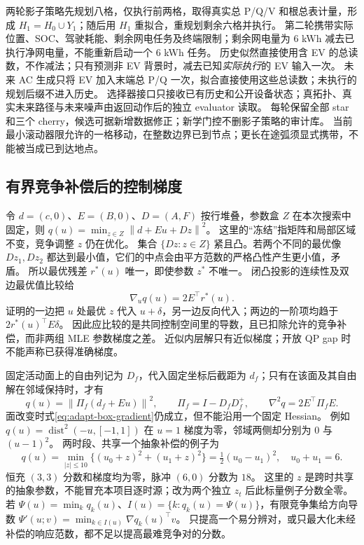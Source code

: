 \documentclass[UTF8,fontset=fandol,11pt,a4paper]{ctexart}
\newcommand{\norm}[1]{\left\lVert#1\right\rVert}
\begin{document}
两轮影子策略先规划八格，仅执行前两格，取得真实总 P/Q/V 和根总表计量，形成 $H_1=H_0\cup Y_1$；随后用 $H_1$ 重拟合，重规划剩余六格并执行。
第二轮携带实际位置、SOC、驾驶耗能、剩余网电任务及终端限制；剩余网电量为 $6$ kWh 减去已执行净网电量，不能重新启动一个 $6$ kWh 任务。
历史似然直接使用含 EV 的总读数，不作减法；只有预测非 EV 背景时，减去已知\emph{实际执行}的 EV 输入一次。
未来 AC 生成只将 EV 加入末端总 P/Q 一次，拟合直接使用这些总读数；未执行的规划后缀不进入历史。
选择器接口只接收已有历史和公开设备状态；真拓扑、真实未来路径与未来噪声由返回动作后的独立 evaluator 读取。
每轮保留全部 star 和三个 cherry，候选可据新增数据修正；新学门控不删影子策略的审计库。
当前最小滚动器限允许的一格移动，在整数边界已到节点；更长在途弧须显式携带，不能被当成已到达地点。

\subsection{有界竞争补偿后的控制梯度}
令 $d=(c,0)$、$E=(B,0)$、$D=(A,F)$ 按行堆叠，参数盒 $Z$ 在本次搜索中固定，则 $q(u)=\min_{z\in Z}\norm{d+Eu+Dz}^2$。
这里的“冻结”指矩阵和局部区域不变，竞争调整 $z$ 仍在优化。
集合 $\{Dz:z\in Z\}$ 紧且凸。若两个不同的最优像 $Dz_1,Dz_2$ 都达到最小值，它们的中点会由平方范数的严格凸性产生更小值，矛盾。
所以最优残差 $r^*(u)$ 唯一，即使参数 $z^*$ 不唯一。
闭凸投影的连续性及双边最优值比较给
\begin{equation}
 \nabla_uq(u)=2E^\top r^*(u).\label{eq:adapt-box-gradient}
\end{equation}
证明的一边把 $u$ 处最优 $z$ 代入 $u+\delta$，另一边反向代入；两边的一阶项均趋于 $2r^*(u)^\top E\delta$。
因此应比较的是共同控制空间里的导数，且已扣除允许的竞争补偿，而非两组 MLE 参数梯度之差。
近似内层解只有近似梯度；开放 QP gap 时不能声称已获得准确梯度。

固定活动面上的自由列记为 $D_f$，代入固定坐标后截距为 $d_f$；只有在该面及其自由解在邻域保持时，才有
\begin{equation}
 q(u)=\norm{\Pi_f(d_f+Eu)}^2,\qquad
 \Pi_f=I-D_fD_f^+,\qquad \nabla^2q=2E^\top\Pi_fE.
\end{equation}
面改变时式\eqref{eq:adapt-box-gradient}仍成立，但不能沿用一个固定 Hessian。
例如 $q(u)=\operatorname{dist}^2(-u,[-1,1])$ 在 $u=1$ 梯度为零，邻域两侧却分别为 $0$ 与 $(u-1)^2$。
两时段、共享一个抽象补偿的例子为
\[
 q(u)=\min_{|z|\le10}\{(u_0+z)^2+(u_1+z)^2\}
      =\tfrac12(u_0-u_1)^2,\quad u_0+u_1=6.
\]
恒充 $(3,3)$ 分数和梯度均为零，脉冲 $(6,0)$ 分数为 $18$。
这里的 $z$ 是跨时共享的抽象参数，不能冒充本项目逐时源；改为两个独立 $z_t$ 后此标量例子分数全零。
若 $\Psi(u)=\min_kq_k(u)$、$I(u)=\{k:q_k(u)=\Psi(u)\}$，有限竞争集给方向导数
$\Psi'(u;v)=\min_{k\in I(u)}\nabla q_k(u)^\top v$。
只提高一个易分辨对，或只最大化未经补偿的响应范数，都不足以提高最难竞争对的分数。
\end{document}
